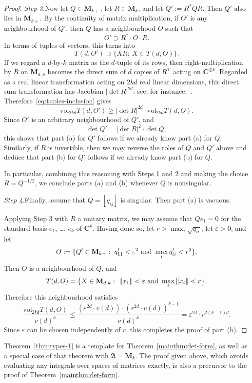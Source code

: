 \documentclass[12pt,a4paper]{article}
\numberwithin{equation}{section}
\theoremstyle{remark}
\renewcommand{\rm}[1]{\mathrm{#1}}
\newcommand{\bbC}{\mathbf{C}}
\newcommand{\rmM}{\mathbf{M}}
\newcommand{\A}{\mathfrak{A}}
\newcommand{\eps}{\varepsilon}
\newcommand{\vol}{\mathrm{vol}}
\begin{document}
\begin{proof}
\emph{Step 3.}\quad Now let $Q \in \rmM_{k+}$, let $R \in \rmM_k$, and let $Q' := R^\ast Q R$.  Then $Q'$ also lies in $\rmM_{k+}$.  By the continuity of matrix multiplication, if $O'$ is any neighbourhood of $Q'$, then $Q$ has a neighbourhood $O$ such that
\[O' \supset R^\ast \cdot O \cdot R.\]
In terms of tuples of vectors, this turns into
\begin{equation}\label{eq:tuples-inclusion}
T(d,O') \supset \{XR:\ X \in T(d,O)\}.
\end{equation}
If we regard a $d$-by-$k$ matrix as the $d$-tuple of its rows, then right-multiplication by $R$ on $\rmM_{d,k}$ becomes the direct sum of $d$ copies of $R^\rm{T}$ acting on $\bbC^{\oplus k}$.  Regarded as a real linear transformation acting on $2kd$ real linear dimensions, this direct sum transformation has Jacobian $|\det R|^{2d}$: see, for instance,~\cite[Subsec. 1.3.5]{RudinFTUB}. Therefore~\eqref{eq:tuples-inclusion} gives
\[\vol_{2kd}T(d,O') \ge |\det R|^{2d}\cdot \vol_{2kd}T(d,O).\]
Since $O'$ is an arbitrary neighbourhood of $Q'$, and
\[\det Q' = |\det R|^2\cdot \det Q,\]
this shows that part (a) for $Q'$ follows if we already know part (a) for $Q$.  Similarly, if $R$ is invertible, then we may reverse the roles of $Q$ and $Q'$ above and deduce that part (b) for $Q'$ follows if we already know part (b) for $Q$.

In particular, combining this reasoning with Steps 1 and 2 and making the choice $R = Q^{-1/2}$, we conclude parts (a) and (b) whenever $Q$ is nonsingular.

\vspace{7pt}

\emph{Step 4.}\quad Finally, assume that $Q = [q_{ij}]$ is singular.  Then part (a) is vacuous.

Applying Step 3 with $R$ a unitary matrix, we may assume that $Qe_1 = 0$ for the standard basis $e_1$, \dots, $e_k$ of $\bbC^k$.  Having done so, let $r > \max_i \sqrt{q_{ii}}$, let $\eps > 0$, and let
\[O := \{Q' \in \rmM_{k+}:\ q_{11}' < \eps^2\ \hbox{and}\ \max_i q'_{ii} < r^2\}.\]
Then $O$ is a neighbourhood of $Q$, and
\[T(d,O) = \big\{X \in\rmM_{d,k}:\ \|x_1\| < \eps\ \hbox{and}\ \max_i \|x_i\| < r\big\}.\]
Therefore this neighbourhood satisfies
\[\frac{\vol_{2kd}T(d,O)}{v(d)^k} \le \frac{(\eps^{2d}\cdot v(d))\cdot (r^{2d}\cdot v(d))^{k-1}}{v(d)^k} = \eps^{2d}\cdot r^{2(k-1)d}.\]
Since $\eps$ can be chosen independently of $r$, this completes the proof of part (b).
\end{proof}

Theorem~\ref{thm:types-1} is a template for Theorem~\ref{mainthm:det-form}, as well as a special case of that theorem with $\A = \rmM_k$.  The proof given above, which avoids evaluating any integrals over spaces of matrices exactly, is also a precursor to the proof of Theorem~\ref{mainthm:det-form}.
\end{document}
